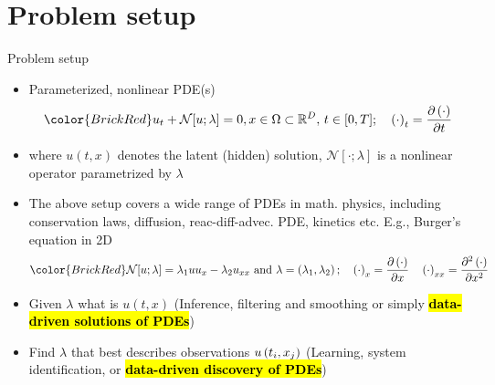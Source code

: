 \documentclass[xcolor=dvipsnames,10pt]{beamer}
\makeatletter
\let\HL\hl
\renewcommand\hl{%
  \let\set@color\beamerorig@set@color
  \let\reset@color\beamerorig@reset@color
  \HL}
\makeatother
\begin{document}
\section{Problem setup}
\begin{frame}[t]{Problem setup}
  \begin{itemize}
    \item<1-> Parameterized, nonlinear PDE(s)
    $$
      \color{BrickRed} u_{t}+\mathcal{N}[u ; \lambda]=0, x \in \Omega \subset \mathbb{R}^D,\, t \in[0, T];\quad \lr{\cdot}_t = \del{\lr{\cdot}}{t}
      \vspace*{-2ex}
    $$\vspace*{-2ex}
    \item<2-> where $u(t, x)$ denotes the latent (hidden) solution, $\mathcal{N}[\cdot ; \lambda]$ is a nonlinear operator parametrized by $\lambda$
    \item<3-> The above setup covers a wide range of PDEs in math. physics, including conservation laws, diffusion, reac-diff-advec. PDE, kinetics etc. E.g., {\color{blue} Burger's equation in 2D}
    $$
      \color{BrickRed}
      \mathcal{N}[u ; \lambda]=\lambda_{1} u u_{x}-\lambda_{2} u_{x x} \text { and } \lambda=\left(\lambda_{1}, \lambda_{2}\right);\quad \lr{\cdot}_{x} = \del{\lr{\cdot}}{x}
      \quad \lr{\cdot}_{xx} = \ddel{\lr{\cdot}}{x}
      \vspace*{-2ex}
    $$\vspace*{-2ex}
    \item<4-> Given $\lambda$ what is $u(t, x)$ (Inference, filtering and smoothing or simply \hl{\bf data-driven solutions of PDEs})
    \item<5-> Find $\lambda$ that best describes observations $u\left(t_i, x_j\right)$ (Learning, system identification, or \hl{\bf data-driven discovery of PDEs})
  \end{itemize}
\end{frame}
\end{document}
